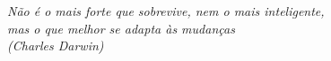 
\vspace*{\fill}
\begin{flushright}
    \textit{Não é o mais forte que sobrevive, nem o mais inteligente,\\
            mas o que melhor se adapta às mudanças \\
           (Charles Darwin)}
\end{flushright}
